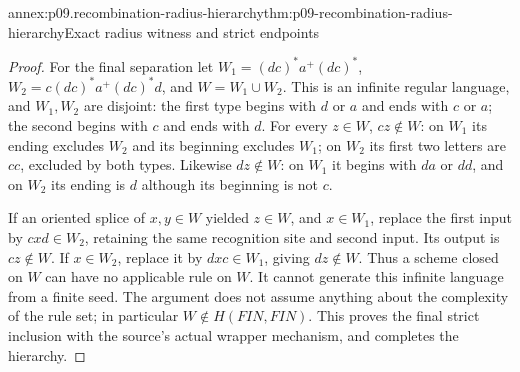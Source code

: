 \begin{annexitem}{annex:p09.recombination-radius-hierarchy}{thm:p09-recombination-radius-hierarchy}{Exact radius witness and strict endpoints}
\begin{proof}
For the final separation let
\(W_1=(dc)^*a^+(dc)^*\),
\(W_2=c(dc)^*a^+(dc)^*d\), and \(W=W_1\cup W_2\).
This is an infinite regular language, and \(W_1,W_2\) are disjoint:
the first type begins with \(d\) or \(a\) and ends with \(c\) or \(a\);
the second begins with \(c\) and ends with \(d\).
For every \(z\in W\), \(cz\notin W\):
on \(W_1\) its ending excludes \(W_2\) and its beginning excludes \(W_1\);
on \(W_2\) its first two letters are \(cc\), excluded by both types.
Likewise \(dz\notin W\): on \(W_1\) it begins with \(da\) or \(dd\),
and on \(W_2\) its ending is \(d\) although its beginning is not \(c\).

If an oriented splice of \(x,y\in W\) yielded \(z\in W\), and \(x\in W_1\),
replace the first input by \(cxd\in W_2\), retaining the same recognition
site and second input. Its output is \(cz\notin W\).
If \(x\in W_2\), replace it by \(dxc\in W_1\), giving \(dz\notin W\).
Thus a scheme closed on \(W\) can have no applicable rule on \(W\).
It cannot generate this infinite language from a finite seed.
The argument does not assume anything about the complexity of the rule set;
in particular \(W\notin H(FIN,FIN)\).
This proves the final strict inclusion with the source's actual wrapper
mechanism, and completes the hierarchy.
\end{proof}
\end{annexitem}

